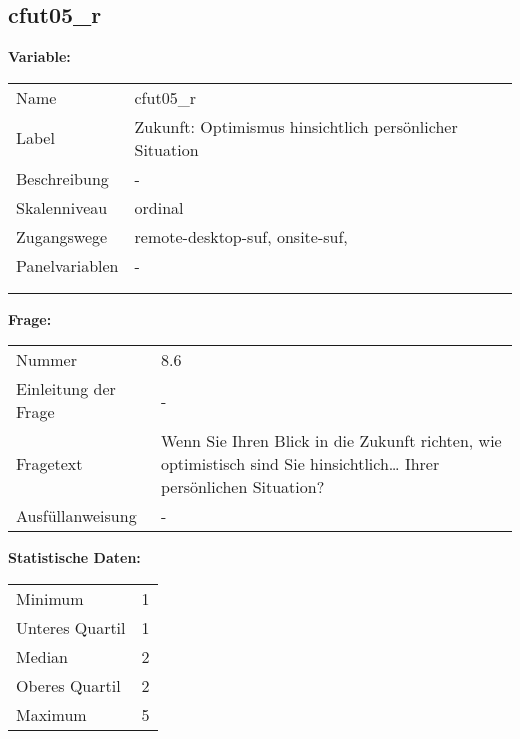 	
	
	\subsection{cfut05\_r}
	\label{subSection:cfut05_r}

	\noindent\textbf{Variable:}\\
		\begin{tabular}{lL{11.3cm}}
			\label{tableVariable:cfut05_r}
			Name & cfut05\_r \\
			Label & Zukunft: Optimismus hinsichtlich persönlicher Situation \\
			Beschreibung & - \\
			Skalenniveau & ordinal \\
			Zugangswege &
				remote-desktop-suf,
				onsite-suf,
 \\
			Panelvariablen & -
			 \\
			 \\
 \\
		\end{tabular}

		\vspace*{1 cm}
		\noindent\textbf{Frage:}\\
		\begin{tabular}{lL{11.3cm}}
			\label{tableQuestion:cfut05_r}
			Nummer & 8.6 \\
			Einleitung der Frage & - \\
			Fragetext & Wenn Sie Ihren Blick in die Zukunft richten, wie optimistisch sind Sie hinsichtlich…
Ihrer persönlichen Situation? \\
			Ausfüllanweisung & - \\
		\end{tabular}


		\vspace*{1 cm}
		\noindent\textbf{Statistische Daten:}\\
			\begin{tabular}{ll}
				\label{tableStatistics:cfut05_r}
					Minimum & 1 \\
					Unteres Quartil & 1 \\
					Median & 2 \\
					Oberes Quartil & 2 \\
					Maximum & 5 \\
			\end{tabular}



